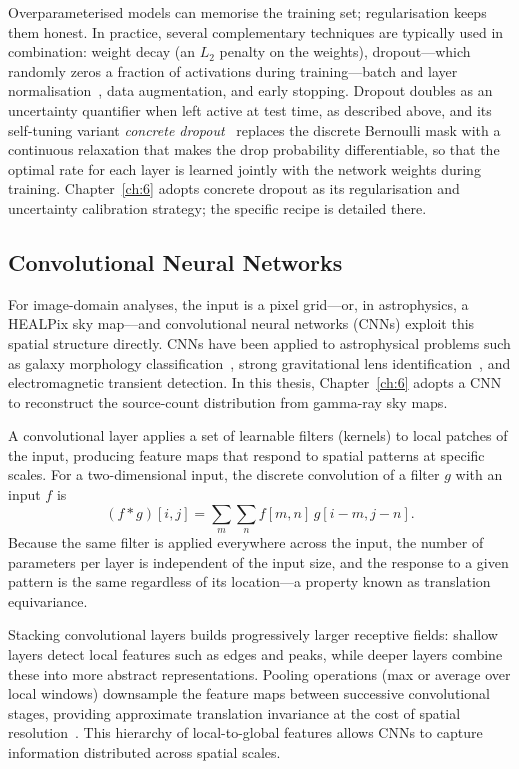 Overparameterised models can memorise the training set; regularisation keeps them honest.
In practice, several complementary techniques are typically used in combination: weight decay (an $L_2$ penalty on the weights), dropout---which randomly zeros a fraction of activations during training---batch and layer normalisation~\cite{batchnorm}, data augmentation, and early stopping.
Dropout doubles as an uncertainty quantifier when left active at test time, as described above, and its self-tuning variant \textit{concrete dropout}~\cite{concrete-dropout} replaces the discrete Bernoulli mask with a continuous relaxation that makes the drop probability differentiable, so that the optimal rate for each layer is learned jointly with the network weights during training.
Chapter~\ref{ch:6} adopts concrete dropout as its regularisation and uncertainty calibration strategy; the specific recipe is detailed there.

\subsection{Convolutional Neural Networks}
\label{sec:3.3.3}

For image-domain analyses, the input is a pixel grid---or, in astrophysics, a HEALPix sky map---and convolutional neural networks (CNNs) exploit this spatial structure directly.
CNNs have been applied to astrophysical problems such as galaxy morphology classification~\cite{Dieleman:2015wdg}, strong gravitational lens identification~\cite{Hezaveh:2017sht}, and electromagnetic transient detection.
In this thesis, Chapter~\ref{ch:6} adopts a CNN to reconstruct the source-count distribution from gamma-ray sky maps.

A convolutional layer applies a set of learnable filters (kernels) to local patches of the input, producing feature maps that respond to spatial patterns at specific scales.
For a two-dimensional input, the discrete convolution of a filter $g$ with an input $f$ is
\begin{equation}
	(f * g)[i,j] = \sum_{m}\sum_{n} f[m,n]\, g[i-m, j-n].
	\label{eq:conv2d}
\end{equation}
Because the same filter is applied everywhere across the input, the number of parameters per layer is independent of the input size, and the response to a given pattern is the same regardless of its location---a property known as translation equivariance.

Stacking convolutional layers builds progressively larger receptive fields: shallow layers detect local features such as edges and peaks, while deeper layers combine these into more abstract representations.
Pooling operations (max or average over local windows) downsample the feature maps between successive convolutional stages, providing approximate translation invariance at the cost of spatial resolution~\cite{Goodfellow:2016dlbook,LeCun:2015pmr}.
This hierarchy of local-to-global features allows CNNs to capture information distributed across spatial scales.

